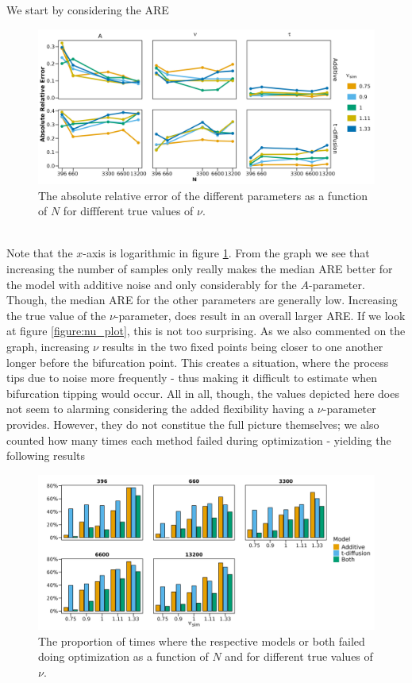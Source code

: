 We start by considering the ARE 
\begin{figure}[h!]
    \begin{center}
        \includegraphics[scale = .1]{figures/combined_nus_plot.jpeg}
        \caption{The absolute relative error of the different parameters as a function of $N$ for diffferent true values of $\nu$.}
        \label{figure:ARE_nu_plots}
    \end{center}
\end{figure}\\
Note that the $x$-axis is logarithmic in figure \ref{figure:ARE_nu_plots}. From the graph we see that increasing the number of samples only really makes the median ARE better for the model with additive noise and only considerably for the $A$-parameter. Though, the median ARE for the other parameters are generally low. Increasing the true value of the $\nu$-parameter, does result in an overall larger ARE. If we look at figure \ref{figure:nu_plot}, this is not too surprising. As we also commented on the graph, increasing $\nu$ results in the two fixed points being closer to one another longer before the bifurcation point. This creates a situation, where the process tips due to noise more frequently - thus making it difficult to estimate when bifurcation tipping would occur. All in all, though, the values depicted here does not seem to alarming considering the added flexibility having a $\nu$-parameter provides. However, they do not constitue the full picture themselves; we also counted how many times each method failed during optimization - yielding the following results
\begin{figure}[h!]
    \begin{center}
        \includegraphics[scale = .1]{figures/error_count_plot.jpeg}
        \caption{The proportion of times where the respective models or both failed doing optimization as a function of $N$ and for different true values of $\nu$.}
        \label{figure:error_count_nu_experiment}
    \end{center}
\end{figure}\\
